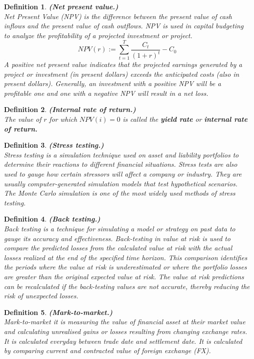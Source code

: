 \documentclass{book}
\newtheorem{definition}{Definition}[section]
\begin{document}
\begin{definition}\textbf{(Net present value.)}\\
Net Present Value (NPV) is the difference between the present value of cash inflows and the present value of cash outflows. NPV is used in capital budgeting to analyze the profitability of a projected investment or project. 
$$
NPV(r):=\sum_{t=1}^{T}\frac{C_{t}}{(1+r)^{t}}-C_{0}
$$
A positive net present value indicates that the projected earnings generated by a project or investment (in present dollars) exceeds the anticipated costs (also in present dollars). Generally, an investment with a positive NPV will be a profitable one and one with a negative NPV will result in a net loss.
\end{definition}
\begin{definition}\textbf{(Internal rate of return.)}\\
The value of $r$ for which $NPV(i)=0$ is called the \textbf{yield rate} or \textbf{internal rate of return.} 
\end{definition}
\begin{definition}\textbf{(Stress testing.)}\\
Stress testing is a simulation technique used on asset and liability portfolios to determine their reactions to different financial situations. Stress tests are also used to gauge how certain stressors will affect a company or industry. They are usually computer-generated simulation models that test hypothetical scenarios. The Monte Carlo simulation is one of the most widely used methods of stress testing.
\end{definition}
\begin{definition}\textbf{(Back testing.)}\\
Back testing is a technique for simulating a model or strategy on past data to gauge its accuracy and effectiveness. Back-testing in value at risk is used to compare the predicted losses from the calculated value at risk with the actual losses realized at the end of the specified time horizon. This comparison identifies the periods where the value at risk is underestimated or where the portfolio losses are greater than the original expected value at risk. The value at risk predictions can be recalculated if the back-testing values are not accurate, thereby reducing the risk of unexpected losses.
\end{definition}
\begin{definition}\textbf{(Mark-to-market.)}\\
Mark-to-market it is measuring the value of financial asset at their market value and calculating unrealised gains or losses resulting from changing exchange rates. It is calculated everyday between trade date and settlement date. It is calculated by comparing current and contracted value of foreign exchange (FX).
\end{definition}
\end{document}

